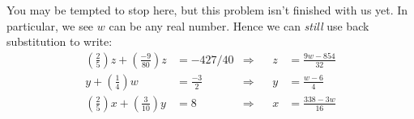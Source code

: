 \documentclass{ximera}
\begin{document}
\begin{example}
\begin{explanation}
You may be tempted to stop here, but this problem isn't finished with
us yet. In particular, we see $w$ can be any real number. Hence we can
\textit{still} use back substitution to write:
\begin{align*}
 \left(\frac{2}{5}\right) z + \left(\frac{-9}{80}\right)z  &= -427/40   &\Rightarrow & & z &= \frac{9 w-854}{32} \\
  y+\left(\frac{1}{4}\right)w &=\frac{-3}{2} &\Rightarrow & & y &= \frac{w-6}{4}\\
  \left(\frac{2}{5}\right)x  +  \left(\frac{3}{10}\right)y  &= 8 &\Rightarrow & & x &= \frac{338-3w}{16}
\end{align*}

\end{explanation}
\end{example}
\end{document}

